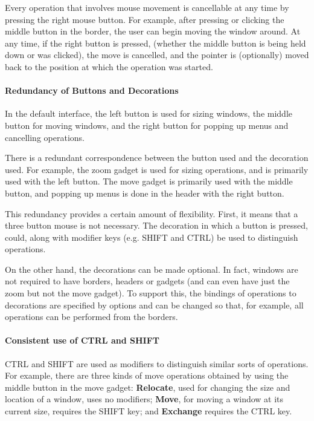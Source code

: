 Every operation that involves mouse movement is cancellable at any
time by pressing the right mouse button.
For example, after pressing or clicking the middle button in the
border, the user can begin moving the
window around.
At any time, if the right button is pressed,
(whether the middle button is
being held down or was clicked), the move is cancelled,
and the pointer is (optionally) moved back to the position at
which the operation was started.

\paragraph{Redundancy of Buttons and Decorations}

In the default interface, the left button is used for sizing windows,
the middle button for moving windows, and the right button for
popping up menus and cancelling operations.

There is a redundant correspondence between the button used and the
decoration used.  For example, the zoom gadget is used for sizing
operations, and is primarily used with the left button.
The move gadget is primarily used with the middle button, and
popping up menus is done in the header with the right button.

This redundancy provides a certain amount of flexibility.
First, it means that a three button mouse is not necessary.
The decoration in which a button is pressed,
could, along with modifier keys (e.g. SHIFT and CTRL) be used to
distinguish operations.

On the other hand, the decorations can be made optional.
In fact, windows are not required to have borders, headers or gadgets
(and can even have just the zoom but not the move gadget).
To support this, the bindings of operations to decorations are specified
by options and can be changed so that, for example, all
operations can be performed from the borders.

\paragraph{Consistent use of CTRL and SHIFT}

CTRL and SHIFT are used as modifiers to distinguish similar sorts of
operations.  For example, there are three kinds of move operations
obtained by using the middle button in the move gadget:  {\bf Relocate},
used for changing the size and location of a window, uses
no modifiers; {\bf Move}, for moving a window at its current size, requires
the SHIFT key; and {\bf Exchange} requires the CTRL key.


